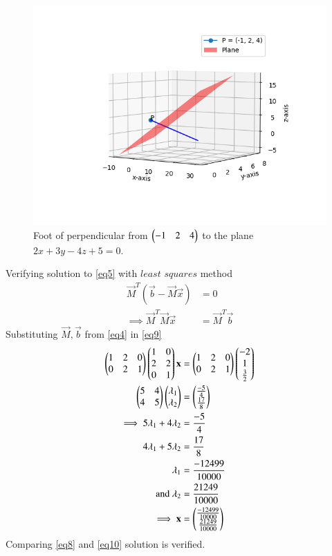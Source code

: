 \documentclass[journal,12pt,twocolumn]{IEEEtran}
\begin{document}
\begin{figure}[h]
    \centering
    \includegraphics[width = \columnwidth]{Assignment_8.png}
    \caption{Foot of perpendicular from $\begin{pmatrix}-1 & 2 & 4\end{pmatrix}$ to the plane $2x +3y -4z +5 = 0$.}
    \label{line and plane}
\end{figure}
\newpage
Verifying solution to \eqref{eq5} with $\textit{least squares}$ method
\begin{align}
	\vec{M}^T(\vec{b} - \vec{M}\vec{x}) &= 0\\
	\label{eq9}\implies \vec{M}^T\vec{M}\vec{x} &= \vec{M}^T\vec{b}
\end{align}
Substituting $\vec{M}, \vec{b}$ from \eqref{eq4} in \eqref{eq9}
\begin{align}
	\begin{pmatrix}1 & 2 & 0\\0 & 2 & 1\end{pmatrix}\begin{pmatrix}1 & 0\\2 & 2\\0 & 1\end{pmatrix}\mathbf{x} &= \begin{pmatrix}1 & 2 & 0\\0 & 2 & 1\end{pmatrix}\begin{pmatrix}-2\\1\\\frac{3}{2}\end{pmatrix}\\
	\begin{pmatrix}5 & 4\\4 & 5\end{pmatrix}\begin{pmatrix}\lambda_1\\\lambda_2\end{pmatrix} &= \begin{pmatrix}\frac{-5}{4}\\\frac{17}{8}\end{pmatrix}\\
	\implies5\lambda_1 + 4\lambda_2&= \frac{-5}{4}\\
	4\lambda_1 + 5\lambda_2&= \frac{17}{8}\\
	\lambda_1 &= \frac{-12499}{10000}\\
	\text{and }\lambda_2 &= \frac{21249}{10000}\\
	\label{eq10}\implies\mathbf{x} &= \begin{pmatrix}\frac{-12499}{10000}\\\frac{21249}{10000}\end{pmatrix}
\end{align}
Comparing \eqref{eq8} and \eqref{eq10} solution is verified.
\end{document}

